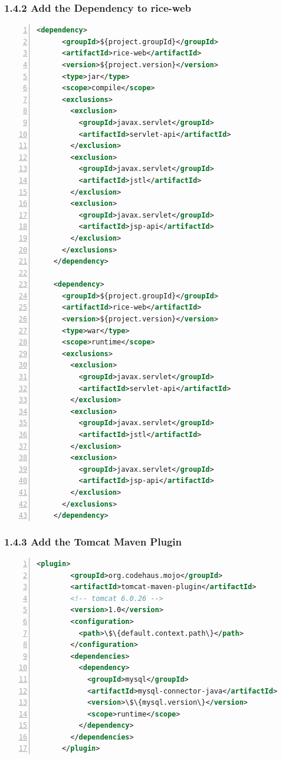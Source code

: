 \subsubsection*{1.4.2 Add the Dependency to rice-web}
\begin{lstlisting}[numbers=left,language=xml,basicstyle=\scriptsize,backgroundcolor=\color{ubergray},caption={training/pom.xml},frame=single,breaklines=true]
    <dependency>
      <groupId>${project.groupId}</groupId>
      <artifactId>rice-web</artifactId>
      <version>${project.version}</version>
      <type>jar</type>
      <scope>compile</scope>
      <exclusions>
        <exclusion>
          <groupId>javax.servlet</groupId>
          <artifactId>servlet-api</artifactId>
        </exclusion>
        <exclusion>
          <groupId>javax.servlet</groupId>
          <artifactId>jstl</artifactId>
        </exclusion>
        <exclusion>
          <groupId>javax.servlet</groupId>
          <artifactId>jsp-api</artifactId>
        </exclusion>
      </exclusions>
    </dependency>

    <dependency>
      <groupId>${project.groupId}</groupId>
      <artifactId>rice-web</artifactId>
      <version>${project.version}</version>
      <type>war</type>
      <scope>runtime</scope>
      <exclusions>
        <exclusion>
          <groupId>javax.servlet</groupId>
          <artifactId>servlet-api</artifactId>
        </exclusion>
        <exclusion>
          <groupId>javax.servlet</groupId>
          <artifactId>jstl</artifactId>
        </exclusion>
        <exclusion>
          <groupId>javax.servlet</groupId>
          <artifactId>jsp-api</artifactId>
        </exclusion>
      </exclusions>
    </dependency>
\end{lstlisting}

\subsubsection*{1.4.3 Add the Tomcat Maven Plugin}
\begin{lstlisting}[numbers=left,language=xml,basicstyle=\scriptsize,backgroundcolor=\color{ubergray},caption={training/pom.xml},frame=single,breaklines=true]
      <plugin>
        <groupId>org.codehaus.mojo</groupId>
        <artifactId>tomcat-maven-plugin</artifactId>
        <!-- tomcat 6.0.26 -->
        <version>1.0</version>
        <configuration>
          <path>\$\{default.context.path\}</path>
        </configuration>
        <dependencies>
          <dependency>
            <groupId>mysql</groupId>
            <artifactId>mysql-connector-java</artifactId>
            <version>\$\{mysql.version\}</version>
            <scope>runtime</scope>
          </dependency>
        </dependencies>
      </plugin>
\end{lstlisting}

